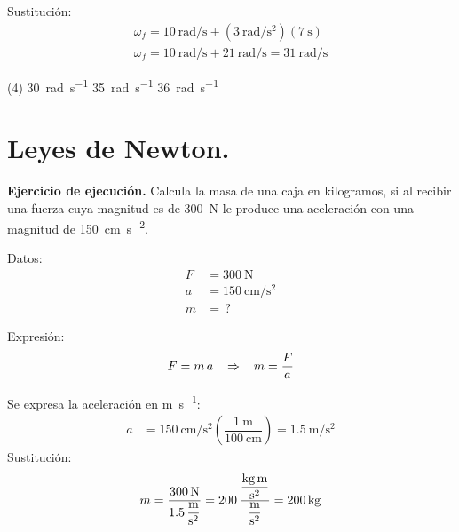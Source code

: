 \documentclass[12pt, letter]{exam}
\begin{document}
\begin{questions}
    Sustitución:
    \begin{align*}
    \omega_{f} = \SI[per-mode=fraction]{10}{\radian\per\second} + \left( \SI[per-mode=fraction]{3}{\radian\per\square\second} \right) \left( \SI{7}{\second} \right) \\[0.5em]
    \omega_{f} = \SI[per-mode=fraction]{10}{\radian\per\second} + \SI[per-mode=fraction]{21}{\radian\per\second} = \SI[per-mode=fraction]{31}{\radian\per\second}
    \end{align*}
    \begin{tasks}(4)
        \task \SI{30}{\radian\per\second}
        \task {}
        \task \SI{35}{\radian\per\second}
        \task \SI{36}{\radian\per\second}
    \end{tasks}

    \section{Leyes de Newton.}

    \setcounter{question}{15} \question \label{Ejercicio_10} \textbf{Ejercicio de ejecución. } Calcula la masa de una caja en kilogramos, si al recibir una fuerza cuya magnitud es de \SI{300}{\newton} le produce una aceleración con una magnitud de \SI{150}{\centi\meter\per\square\second}.
    
    \begin{minipage}[t]{0.35\linewidth}
    Datos: 
    \begin{align*}
    F &= \SI{300}{\newton} \\
    a &= \SI{150}{\centi\meter\per\square\second} \\
    m &= \, ?
    \end{align*}
    \end{minipage}
    \hspace{1cm}
    \begin{minipage}[t]{0.4\linewidth}
    Expresión:
    \begin{align*}
    F = m \, a \hspace{0.3cm} \Rightarrow \hspace{0.3cm} m = \dfrac{F}{a}
    \end{align*}
    \end{minipage}

    Se expresa la aceleración en \unit{\meter\per\second}:
    \begin{align*}
        a &= \SI[per-mode=fraction]{150}{\centi\meter\per\square\second} \left( \dfrac{\SI{1}{\meter}}{\SI{100}{\centi\meter}} \right) = \SI[per-mode=fraction]{1.5}{\meter\per\square\second}
    \end{align*}
    Sustitución:
    \begin{align*}
    m = \dfrac{\SI{300}{\newton}}{\displaystyle \SI[per-mode=fraction]{1.5}{\meter\per\square\second}} = \num{200} \, \dfrac{\displaystyle \unit[per-mode=fraction]{\kilo\gram\meter\per\square\second}}{\displaystyle \unit[per-mode=fraction]{\meter\per\square\second}} = \SI{200}{\kilo\gram}
    \end{align*}
        

\end{questions}
\end{document}
